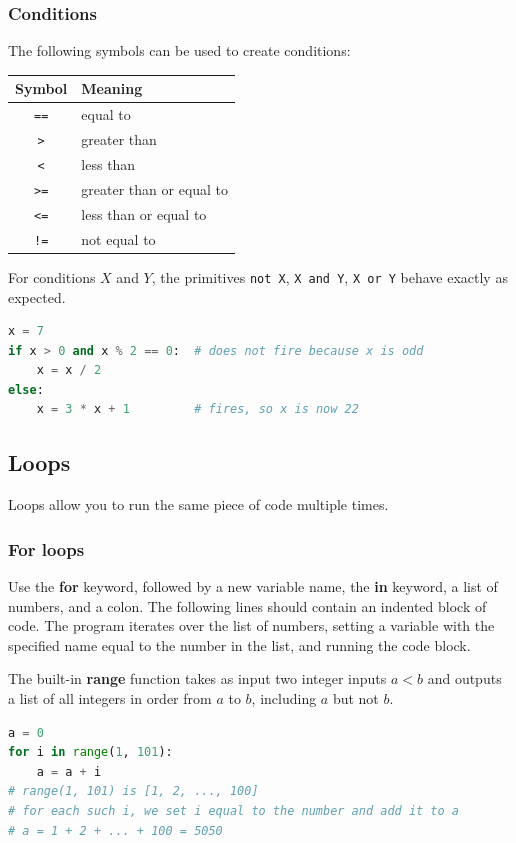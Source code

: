 \documentclass[11pt]{scrartcl}
\begin{document}
\subsubsection{Conditions}
The following symbols can be used to create conditions:
\begin{center}
\begin{tabular}{cl}
    \toprule
    Symbol & Meaning \\ \midrule
    \texttt{==}& equal to \\
    \texttt{>} & greater than \\
    \texttt{<} & less than \\
    \texttt{>=} & greater than or equal to \\
    \texttt{<=} & less than or equal to \\
    \texttt{!=} & not equal to \\
    \bottomrule
\end{tabular}
\end{center}
For conditions $X$ and $Y$, the primitives
\texttt{not X}, \texttt{X and Y}, \texttt{X or Y}
behave exactly as expected.

\begin{lstlisting}[language=Python]
x = 7
if x > 0 and x % 2 == 0:  # does not fire because x is odd
    x = x / 2
else:
    x = 3 * x + 1         # fires, so x is now 22
\end{lstlisting}

\subsection{Loops}
Loops allow you to run the same piece of code multiple times.
\subsubsection{For loops}
Use the \textbf{for} keyword, followed by a new variable name, the \textbf{in} keyword,
a list of numbers, and a colon. The following lines should contain an indented block of code.
The program iterates over the list of numbers,
setting a variable with the specified name equal to the number in the list, and running the code block.

The built-in \textbf{range} function takes as input two integer inputs $a < b$
and outputs a list of all integers in order from $a$ to $b$, including $a$ but not $b$.
\begin{lstlisting}[language=Python]
a = 0
for i in range(1, 101):
    a = a + i
# range(1, 101) is [1, 2, ..., 100]
# for each such i, we set i equal to the number and add it to a
# a = 1 + 2 + ... + 100 = 5050
\end{lstlisting}
\end{document}
